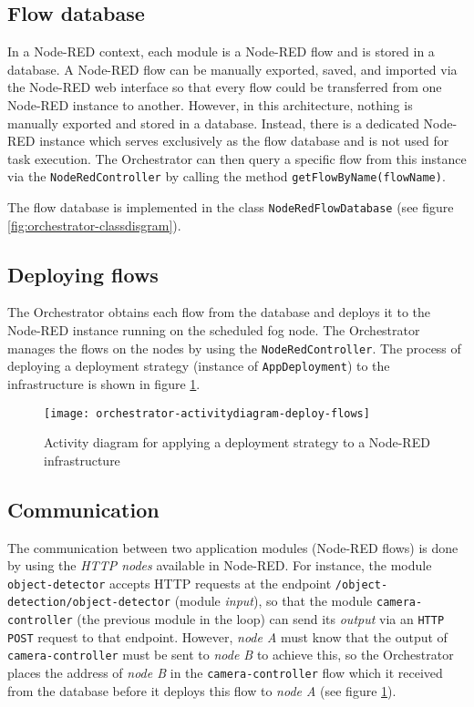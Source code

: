 \subsection*{Flow database}
In a Node-RED context, each module is a Node-RED flow and is stored in a database.
A Node-RED flow can be manually exported, saved, and imported via the Node-RED web interface so that every flow could be transferred from one Node-RED instance to another.
However, in this architecture, nothing is manually exported and stored in a database.
Instead, there is a dedicated Node-RED instance which serves exclusively as the flow database and is not used for task execution.
The Orchestrator can then query a specific flow from this instance via the \texttt{NodeRedController} by calling the method \texttt{getFlowByName(flowName)}.

The flow database is implemented in the class \texttt{NodeRedFlowDatabase} (see figure \ref{fig:orchestrator-classdisgram}).

\subsection*{Deploying flows}
The Orchestrator obtains each flow from the database and deploys it to the Node-RED instance running on the scheduled fog node.
The Orchestrator manages the flows on the nodes by using the \texttt{NodeRedController}.
The process of deploying a deployment strategy (instance of \texttt{AppDeployment}) to the infrastructure is shown in figure \ref{fig:orchestrator-activitydiagram-deploy-flows}.

\begin{figure}[htb]
    \centering
    \texttt{[image: orchestrator-activitydiagram-deploy-flows]}
    \caption{Activity diagram for applying a deployment strategy to a Node-RED infrastructure}
    \label{fig:orchestrator-activitydiagram-deploy-flows}
\end{figure}

\subsection*{Communication}
The communication between two application modules (Node-RED flows) is done by using the \textit{HTTP nodes} available in Node-RED.
For instance, the module \texttt{object-detector} accepts HTTP requests at the endpoint \texttt{/object-detection/object-detector} (module \textit{input}), so that the module \texttt{camera-controller} (the previous module in the loop) can send its \textit{output} via an \texttt{HTTP POST} request to that endpoint.
However, \textit{node A} must know that the output of \texttt{camera-controller} must be sent to \textit{node B} to achieve this, so the Orchestrator places the address of \textit{node B} in the \texttt{camera-controller} flow which it received from the database before it deploys this flow to \textit{node A} (see figure \ref{fig:orchestrator-activitydiagram-deploy-flows}).

